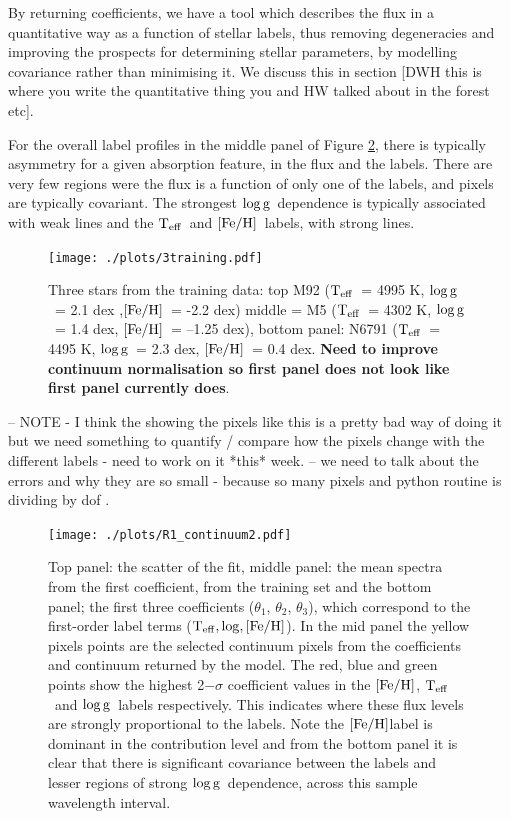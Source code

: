 \documentclass[12pt, preprint]{aastex}
\newcommand{\teff}{\mbox{$\rm T_{eff}$}}
\newcommand{\feh}{\mbox{$\rm [Fe/H]$}}
\newcommand{\logg}{\mbox{$\rm \log g$}}
\begin{document}
By returning coefficients, we have a tool which describes the flux in a quantitative way as a function of stellar labels, thus removing degeneracies and improving the prospects for determining stellar parameters, by modelling covariance rather than minimising it. We discuss this in section [DWH this is where you write the quantitative thing you and HW talked about in the forest etc].

For the overall label profiles in the middle panel of Figure \ref{fig:coeffs}, there is typically asymmetry for a given absorption feature, in the flux and the labels. There are very few regions were the flux is a function of only one of the labels, and pixels are typically covariant. The strongest \logg\ dependence is typically associated with weak lines and the \teff\ and \feh\ labels, with strong lines. 


\begin{figure}[h!]
  \texttt{[image: ./plots/3training.pdf]}
\caption{Three stars from the training data: top M92 (\teff\ = 4995 K, \logg\ = 2.1 dex ,\feh\, = -2.2 dex) middle = M5 (\teff\ = 4302 K, \logg\ = 1.4 dex, \feh\ = --1.25 dex), bottom panel: N6791 (\teff\  = 4495 K, \logg\ = 2.3 dex, \feh\ = 0.4 dex. \textbf{Need to improve continuum normalisation so first panel does not look like first panel currently does}. }
\label{fig:cal_feh}
\end{figure}


-- NOTE - I think the showing the pixels like this is a pretty bad way of doing it but we need something to quantify / compare how the pixels change with the different labels - need to work on it *this* week. 
 -- we need to talk about the errors and why they are so small - because so many pixels and python routine is dividing by dof .
 
\begin{figure}[h!]
    \texttt{[image: ./plots/R1\_continuum2.pdf]}
  \caption{Top panel: the scatter of the fit, middle panel: the mean spectra from the first coefficient, from the training set and the bottom panel; the first three coefficients ($\theta_1$, $\theta_2$, $\theta_3$),  which correspond to the first-order label terms ($\teff, \log, \feh$). In the mid panel the yellow pixels points are the selected continuum pixels from the coefficients and continuum returned by the model.  The red, blue and green points show the highest 2$-\sigma$ coefficient values in the \feh, \teff\ and \logg\ labels respectively. This indicates where these flux levels are strongly proportional to the labels. Note the \feh label is dominant in the contribution level and from the bottom panel it is clear that there is significant covariance between the labels and lesser regions of strong \logg\ dependence, across this sample wavelength interval.}
\label{fig:coeffs}
\end{figure}
\end{document}
